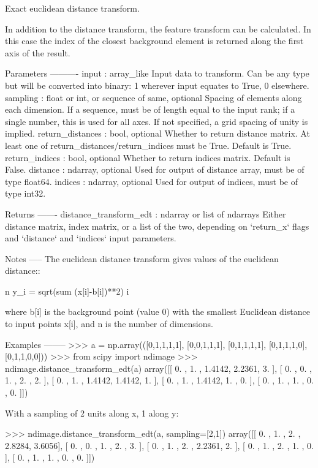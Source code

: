\begin{DoxyVerb}Exact euclidean distance transform.

In addition to the distance transform, the feature transform can
be calculated. In this case the index of the closest background
element is returned along the first axis of the result.

Parameters
----------
input : array_like
    Input data to transform. Can be any type but will be converted
    into binary: 1 wherever input equates to True, 0 elsewhere.
sampling : float or int, or sequence of same, optional
    Spacing of elements along each dimension. If a sequence, must be of
    length equal to the input rank; if a single number, this is used for
    all axes. If not specified, a grid spacing of unity is implied.
return_distances : bool, optional
    Whether to return distance matrix. At least one of
    return_distances/return_indices must be True. Default is True.
return_indices : bool, optional
    Whether to return indices matrix. Default is False.
distance : ndarray, optional
    Used for output of distance array, must be of type float64.
indices : ndarray, optional
    Used for output of indices, must be of type int32.

Returns
-------
distance_transform_edt : ndarray or list of ndarrays
    Either distance matrix, index matrix, or a list of the two,
    depending on `return_x` flags and `distance` and `indices`
    input parameters.

Notes
-----
The euclidean distance transform gives values of the euclidean
distance::

                n
  y_i = sqrt(sum (x[i]-b[i])**2)
                i

where b[i] is the background point (value 0) with the smallest
Euclidean distance to input points x[i], and n is the
number of dimensions.

Examples
--------
>>> a = np.array(([0,1,1,1,1],
                  [0,0,1,1,1],
                  [0,1,1,1,1],
                  [0,1,1,1,0],
                  [0,1,1,0,0]))
>>> from scipy import ndimage
>>> ndimage.distance_transform_edt(a)
array([[ 0.    ,  1.    ,  1.4142,  2.2361,  3.    ],
       [ 0.    ,  0.    ,  1.    ,  2.    ,  2.    ],
       [ 0.    ,  1.    ,  1.4142,  1.4142,  1.    ],
       [ 0.    ,  1.    ,  1.4142,  1.    ,  0.    ],
       [ 0.    ,  1.    ,  1.    ,  0.    ,  0.    ]])

With a sampling of 2 units along x, 1 along y:

>>> ndimage.distance_transform_edt(a, sampling=[2,1])
array([[ 0.    ,  1.    ,  2.    ,  2.8284,  3.6056],
       [ 0.    ,  0.    ,  1.    ,  2.    ,  3.    ],
       [ 0.    ,  1.    ,  2.    ,  2.2361,  2.    ],
       [ 0.    ,  1.    ,  2.    ,  1.    ,  0.    ],
       [ 0.    ,  1.    ,  1.    ,  0.    ,  0.    ]])


\end{DoxyVerb}
